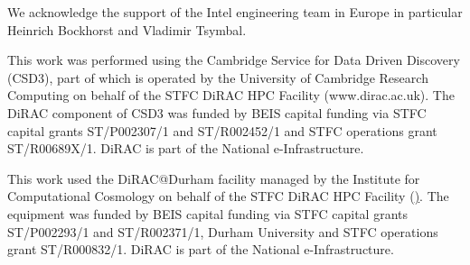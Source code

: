 
We acknowledge the support of the Intel engineering team in Europe in particular Heinrich Bockhorst and Vladimir Tsymbal.

This work was performed using the Cambridge Service for Data Driven Discovery (CSD3), part of which is operated by the University of Cambridge Research Computing on behalf of the STFC DiRAC HPC Facility (www.dirac.ac.uk).
The DiRAC component of CSD3 was funded by BEIS capital funding via STFC capital grants ST/P002307/1 and ST/R002452/1 and STFC operations grant ST/R00689X/1.
DiRAC is part of the National e-Infrastructure.

This work used the DiRAC@Durham facility managed by the Institute for Computational Cosmology on behalf of the STFC DiRAC HPC Facility (\href{https://www.dirac.ac.uk/}).
The equipment was funded by BEIS capital funding via STFC capital grants ST/P002293/1 and ST/R002371/1, Durham University and STFC operations grant ST/R000832/1.
DiRAC is part of the National e-Infrastructure.
